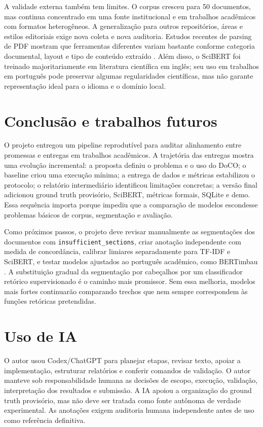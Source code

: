 \documentclass[12pt]{article}
\begin{document}
A validade externa também tem limites. O corpus cresceu para 50 documentos, mas continua concentrado em uma fonte institucional e em trabalhos acadêmicos com formatos heterogêneos. A generalização para outros repositórios, áreas e estilos editoriais exige nova coleta e nova auditoria. Estudos recentes de parsing de PDF mostram que ferramentas diferentes variam bastante conforme categoria documental, layout e tipo de conteúdo extraído \cite{li2024pdfparsing}. Além disso, o SciBERT foi treinado majoritariamente em literatura científica em inglês; seu uso em trabalhos em português pode preservar algumas regularidades científicas, mas não garante representação ideal para o idioma e o domínio local.

\section{Conclusão e trabalhos futuros}

O projeto entregou um pipeline reprodutível para auditar alinhamento entre promessas e entregas em trabalhos acadêmicos. A trajetória das entregas mostra uma evolução incremental: a proposta definiu o problema e o uso do DoCO; o baseline criou uma execução mínima; a entrega de dados e métricas estabilizou o protocolo; o relatório intermediário identificou limitações concretas; a versão final adicionou ground truth provisório, SciBERT, métricas formais, SQLite e demo. Essa sequência importa porque impediu que a comparação de modelos escondesse problemas básicos de corpus, segmentação e avaliação.

Como próximos passos, o projeto deve revisar manualmente as segmentações dos documentos com \texttt{insufficient\_sections}, criar anotação independente com medida de concordância, calibrar limiares separadamente para TF-IDF e SciBERT, e testar modelos ajustados ao português acadêmico, como BERTimbau \cite{souza2020bertimbau}. A substituição gradual da segmentação por cabeçalhos por um classificador retórico supervisionado é o caminho mais promissor. Sem essa melhoria, modelos mais fortes continuarão comparando trechos que nem sempre correspondem às funções retóricas pretendidas.

\appendix

\section{Uso de IA}

O autor usou Codex/ChatGPT para planejar etapas, revisar texto, apoiar a implementação, estruturar relatórios e conferir comandos de validação. O autor manteve sob responsabilidade humana as decisões de escopo, execução, validação, interpretação dos resultados e submissão. A IA apoiou a organização do ground truth provisório, mas não deve ser tratada como fonte autônoma de verdade experimental. As anotações exigem auditoria humana independente antes de uso como referência definitiva.
\end{document}
